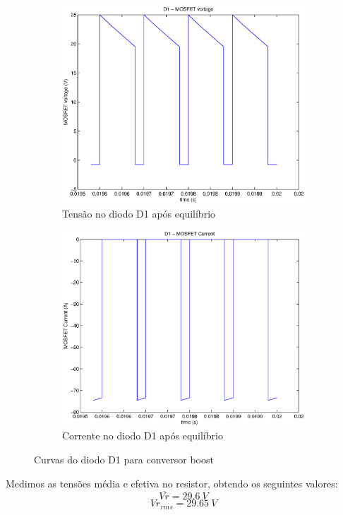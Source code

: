 \documentclass{article}
\begin{document}
\begin{figure}[H]
\begin{subfigure}[b]{0.4\linewidth}
			\includegraphics[width=\linewidth]{matlab/boost/r_d1vst}
			\caption{Tensão no diodo D1 após equilíbrio}
		\end{subfigure}
		\begin{subfigure}[b]{0.4\linewidth}
			\centering
			\includegraphics[width=\linewidth]{matlab/boost/r_d1ist}
			\caption{Corrente no diodo D1 após equilíbrio}
		\end{subfigure}
	\caption{Curvas do diodo D1 para conversor boost}
	\label{fig:bod1}
\end{figure}

Medimos as tensões média e efetiva no resistor, obtendo os seguintes valores:
\begin{equation}
\overline{Vr} = 29.6\ V
\end{equation}
\begin{equation}
Vr_{rms} = 29.65\ V
\end{equation}
\end{document}
